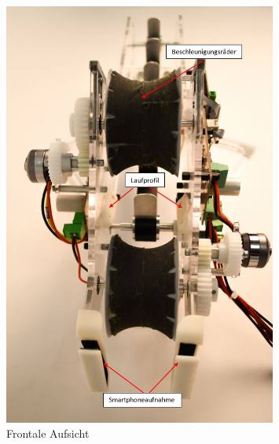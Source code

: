 	\begin{figure}[h!]
	   	\includegraphics[width=0.8\textwidth,clip,trim=0mm 0mm 0mm 0mm, angle =-90]
	   	{Enddokumentation/Bilder/Geraeteuebersicht_3.jpg}
	   	\centering
	   	\caption{Frontale Aufsicht}
	   	\label{abb:Frontale Aufsicht}
	\end{figure}
    
    
    \newpage
